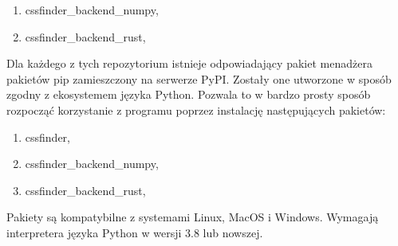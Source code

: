 \documentclass[11pt, a4paper]{article}
\begin{document}
\begin{sloppypar}
\begin{enumerate}
      \item cssfinder\_backend\_numpy\cite{CSSFinder_New_Numpy},

      \item cssfinder\_backend\_rust\cite{CSSFinder_New_Rust},
    \end{enumerate}

    Dla każdego z tych repozytorium istnieje odpowiadający pakiet menadżera pakietów pip
    zamieszczony na serwerze PyPI. Zostały one utworzone w sposób zgodny z ekosystemem
    języka Python. Pozwala to w bardzo prosty sposób rozpocząć korzystanie z programu poprzez
    instalację następujących pakietów:
    \begin{enumerate}
      \item cssfinder\cite{CSSFinder_New_PyPI},

      \item cssfinder\_backend\_numpy\cite{CSSFinder_New_Numpy_PyPI},

      \item cssfinder\_backend\_rust\cite{CSSFinder_New_Rust_PyPI},
    \end{enumerate}

    Pakiety są kompatybilne z systemami Linux, MacOS i Windows. Wymagają interpretera języka
    Python w wersji 3.8 lub nowszej.
  \end{sloppypar}
  \newpage
  \begin{sloppypar}
    \medskip


    \printbibliography
    [heading=bibintoc, title={Odwołania}]
  \end{sloppypar}
\end{document}
